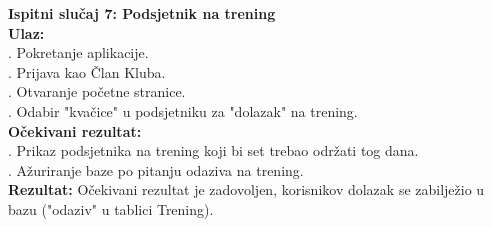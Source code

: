 \documentclass[times, utf8, zavrsni]{fer}
\begin{document}
		\noindent \textbf{Ispitni slučaj 7: Podsjetnik na trening}\\
			\textbf{Ulaz:}\\
			    . Pokretanje aplikacije.\\
			    . Prijava kao Član Kluba.\\
			    . Otvaranje početne stranice.\\
			    . Odabir "kvačice" u podsjetniku za "dolazak" na trening.\\
			   
			\noindent\textbf{Očekivani rezultat:}\\
			    . Prikaz podsjetnika na trening koji bi set trebao održati tog dana.\\
			    . Ažuriranje baze po pitanju odaziva na trening.\\
			    
			\noindent\textbf{Rezultat:}
			    \noindent Očekivani rezultat je zadovoljen, korisnikov dolazak se zabilježio u bazu ("odaziv" u tablici Trening).
			    
\end{document}
